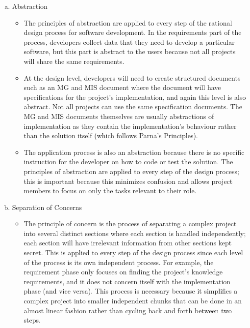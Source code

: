 \documentclass[12pt,fleqn]{examtst}
\begin{document}
\begin{enumerate}[a)]
\item Abstraction
  \begin{itemize}
  \item
    The principles of abstraction are applied to every step of the rational design process for software development. In the requirements part of the process, developers collect data that they need to develop a particular software, but this part is abstract to the users because not all projects will share the same requirements.
  \item
    At the design level, developers will need to create structured documents such as an MG and MIS document where the document will have specifications for the project's implementation, and again this level is also abstract. Not all projects can use the same specification documents. The MG and MIS documents themselves are usually abstractions of implementation as they contain the implementation's behaviour rather than the solution itself (which follows Parna's Principles). 
  \item
    The application process is also an abstraction because there is no specific instruction for the developer on how to code or test the solution. The principles of abstraction are applied to every step of the design process; this is important because this minimizes confusion and allows project members to focus on only the tasks relevant to their role. 
  \end{itemize}
\item Separation of Concerns
  \begin{itemize}
  \item
    The principle of concern is the process of separating a complex project into several distinct sections where each section is handled independently; each section will have irrelevant information from other sections kept secret. This is applied to every step of the design process since each level of the process is its own independent process. For example, the requirement phase only focuses on finding the project's knowledge requirements, and it does not concern itself with the implementation phase (and vice versa). This process is necessary because it simplifies a complex project into smaller independent chunks that can be done in an almost linear fashion rather than cycling back and forth between two steps.
  \end{itemize}
\end{enumerate}

\end{document}
